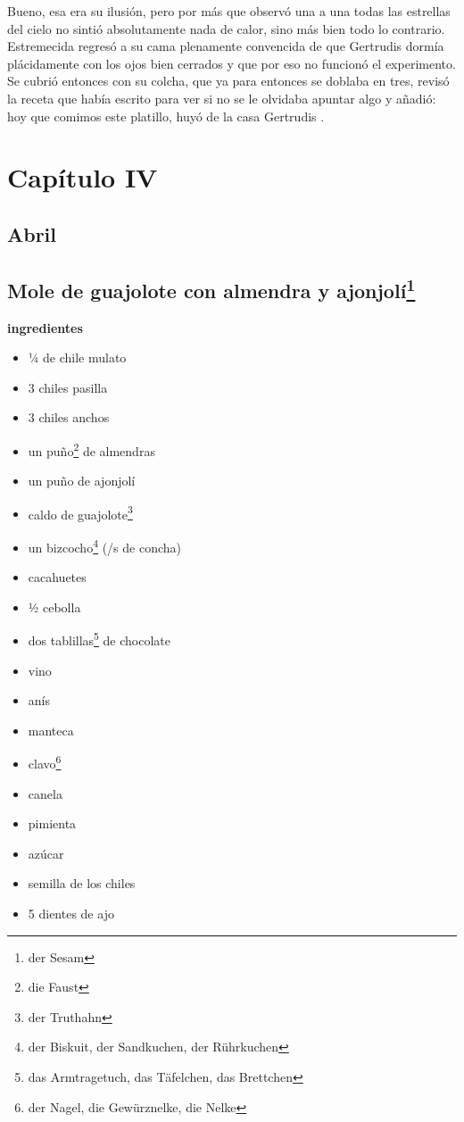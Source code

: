 Bueno, esa era su ilusión, pero por más que observó una a una todas las
estrellas del cielo no sintió absolutamente nada de calor, sino más bien
todo lo contrario. Estremecida regresó a su cama plenamente convencida
de que Gertrudis dormía plácidamente con los ojos bien cerrados y que
por eso no funcionó el experimento. Se cubrió entonces con su colcha,
que ya para entonces se doblaba en tres, revisó la receta que había
escrito para ver si no se le olvidaba apuntar algo y añadió: \glqq{}hoy que
comimos este platillo, huyó de la casa Gertrudis \ndots\grqq{}.

\clearpage

\section*{ Capítulo IV }
\subsection*{ Abril }
\subsection*{ Mole de guajolote con almendra y ajonjolí\footnote{der Sesam} }
\textbf{ingredientes}

\begin{itemize}
    \item ¼ de chile mulato
    \item 3 chiles pasilla
    \item 3 chiles anchos
    \item un puño\footnote{die Faust} de almendras
    \item un puño de ajonjolí
    \item caldo de guajolote\footnote{der Truthahn}
    \item un bizcocho\footnote{der Biskuit, der Sandkuchen, der Rührkuchen} (/s de concha)
    \item cacahuetes
    \item ½ cebolla
    \item dos tablillas\footnote{das Armtragetuch, das Täfelchen, das Brettchen} de chocolate
    \item vino
    \item anís
    \item manteca
    \item clavo\footnote{der Nagel, die Gewürznelke, die Nelke}
    \item canela
    \item pimienta
    \item azúcar
    \item semilla de los chiles
    \item 5 dientes de ajo
\end{itemize}


